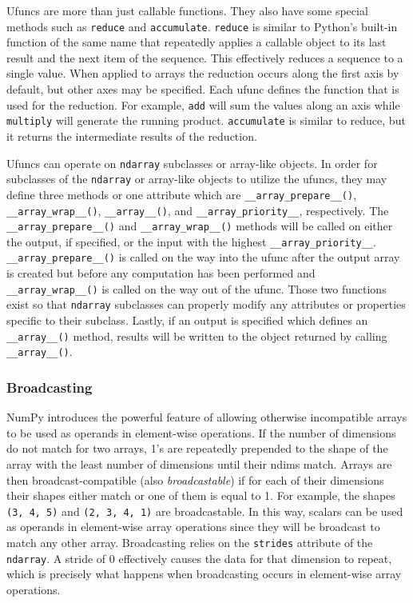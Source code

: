 \documentclass{sigplanconf}
\begin{document}
Ufuncs are more than just callable functions. They also have some special
methods such as \verb=reduce= and \verb=accumulate=. \verb=reduce= is similar
to Python’s built-in function of the same name that repeatedly applies a
callable object to its last result and the next item of the sequence. This
effectively reduces a sequence to a single value. When applied to arrays the
reduction occurs along the first axis by default, but other axes may be
specified. Each ufunc defines the function that is used for the reduction. For
example, \verb=add= will sum the values along an axis while \verb=multiply=
will generate the running product.  \verb=accumulate= is similar to reduce,
but it returns the intermediate results of the reduction.

Ufuncs can operate on \verb=ndarray= subclasses or array-like objects. In
order for subclasses of the \verb=ndarray= or array-like objects to utilize
the ufuncs, they may define three methods or one attribute which are
\verb=__array_prepare__()=, \verb=__array_wrap__()=, \verb=__array__()=, and
\verb=__array_priority__=, respectively.  The\linebreak
\verb=__array_prepare__()= and \verb=__array_wrap__()= methods will be called
on either the output, if specified, or the input with the highest
\verb=__array_priority__=.  \verb=__array_prepare__()= is called on the way
into the ufunc after the output array is created but before any computation
has been performed and \verb=__array_wrap__()= is called on the way out of the
ufunc. Those two functions exist so that \verb=ndarray= subclasses can
properly modify any attributes or properties specific to their subclass.
Lastly, if an output is specified which defines an \verb=__array__()= method,
results will be written to the object returned by calling \verb=__array__()=.

\subsubsection{Broadcasting}

NumPy introduces the powerful feature of allowing otherwise incompatible
arrays to be used as operands in element-wise operations. If the number of
dimensions do not match for two arrays, 1’s are repeatedly prepended to the
shape of the array with the least number of dimensions until their ndims
match. Arrays are then broadcast-compatible (also \emph{broadcastable}) if for
each of their dimensions their shapes either match or one of them is equal to
1.  For example, the shapes \verb=(3, 4, 5)= and \verb=(2, 3, 4, 1)= are
broadcastable. In this way, scalars can be used as operands in element-wise
array operations since they will be broadcast to match any other array.
Broadcasting relies on the \texttt{strides} attribute of the \texttt{ndarray}.
A stride of 0 effectively causes the data for that dimension to repeat, which
is precisely what happens when broadcasting occurs in element-wise array
operations.
\end{document}
